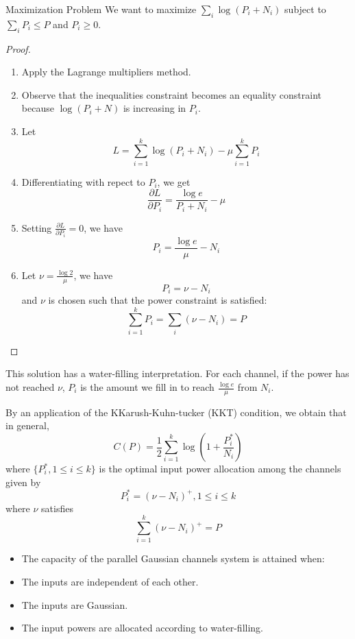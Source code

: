 \documentclass[../main.tex]{subfiles}
\begin{document}
\begin{bbox}{Maximization Problem}
    We want to maximize $\sum_i\log (P_i + N_i)$ subject to $\sum_i P_i\leq P$ and $P_i \geq 0$.
    \begin{proof}
        \begin{enumerate}
            \item Apply the Lagrange multipliers method.
            \item Observe that the inequalities constraint becomes an equality constraint because $\log(P_i+N)$ is increasing in $P_i$.
            \item Let \[
                L=\sum_{i=1}^k\log(P_i+N_i)-\mu\sum_{i=1}^k P_i
            \]
            \item Differentiating with repect to $P_i$, we get \[
            \frac{\partial L}{\partial P_i}=\frac{\log e}{P_i+N_i} - \mu
            \]
            \item Setting $\frac{\partial L}{\partial P_i}=0$, we have \[
            P_i=\frac{\log e}{\mu}-N_i
            \]
            \item Let $\nu=\frac{\log 2}{\mu}$, we have \[
            P_i=\nu-N_i
            \] and $\nu$ is chosen such that the power constraint is satisfied:\[
            \sum_{i=1}^kP_i=\sum_i(\nu-N_i)=P
            \]
        \end{enumerate}
    \end{proof}
    This solution has a water-filling interpretation. For each channel, if the power has not reached $\nu$, $P_i$ is the amount we fill in to reach $\frac{\log e}{\mu}$ from $N_i$.
\end{bbox}
\begin{remark}
    By an application of the KKarush-Kuhn-tucker (KKT) condition, we obtain that in general,\[
    C(P)=\frac{1}{2}\sum_{i=1}^k\log\left(1+\frac{P_i^*}{N_i}\right)
    \] where $\{P_i^*,1\leq i\leq k\}$ is the optimal input power allocation among the channels given by \[
    P_i^*=(\nu-N_i)^+, 1\leq i\leq k
    \] where $\nu$ satisfies \[
    \sum_{i=1}^k(\nu-N_i)^+=P
    \]
    \begin{itemize}
        \item The capacity of the parallel Gaussian channels system is attained when:
        \item The inputs are independent of each other.
        \item The inputs are Gaussian.
        \item The input powers are allocated according to water-filling.
    \end{itemize}
\end{remark}
\end{document}
